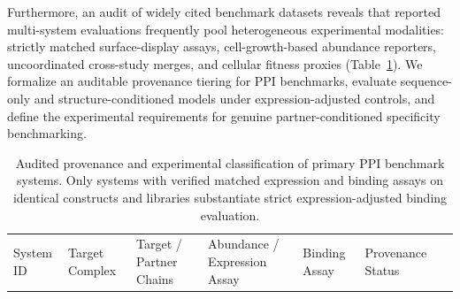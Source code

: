 \documentclass[
  11pt,
  us-letterpaper,
  DIV=11,
  numbers=noendperiod]{scrartcl}
\begin{document}
Furthermore, an audit of widely cited benchmark datasets reveals that
reported multi-system evaluations frequently pool heterogeneous
experimental modalities: strictly matched surface-display assays,
cell-growth-based abundance reporters, uncoordinated cross-study merges,
and cellular fitness proxies (Table~\ref{tbl-provenance-summary}). We
formalize an auditable provenance tiering for PPI benchmarks, evaluate
sequence-only and structure-conditioned models under expression-adjusted
controls, and define the experimental requirements for genuine
partner-conditioned specificity benchmarking.

\begin{longtable}[]{@{}
  >{\raggedright\arraybackslash}p{}
  >{\centering\arraybackslash}p{}
  >{\centering\arraybackslash}p{}
  >{\raggedright\arraybackslash}p{}
  >{\raggedright\arraybackslash}p{}
  >{\centering\arraybackslash}p{}
  >{\raggedright\arraybackslash}p{}@{}}
\caption{Audited provenance and experimental classification of primary
PPI benchmark systems. Only systems with verified matched expression and
binding assays on identical constructs and libraries substantiate strict
expression-adjusted binding
evaluation.}\label{tbl-provenance-summary}\tabularnewline
\toprule\noalign{}
\begin{minipage}[b]{\linewidth}\raggedright
System ID
\end{minipage} & \begin{minipage}[b]{\linewidth}\centering
Target Complex
\end{minipage} & \begin{minipage}[b]{\linewidth}\centering
Target / Partner Chains
\end{minipage} & \begin{minipage}[b]{\linewidth}\raggedright
Abundance / Expression Assay
\end{minipage} & \begin{minipage}[b]{\linewidth}\raggedright
Binding Assay
\end{minipage} & \begin{minipage}[b]{\linewidth}\centering
Provenance Status
\end{minipage} & \begin{minipage}[b]{\linewidth}\raggedright

\end{minipage}
\end{longtable}
\end{document}
